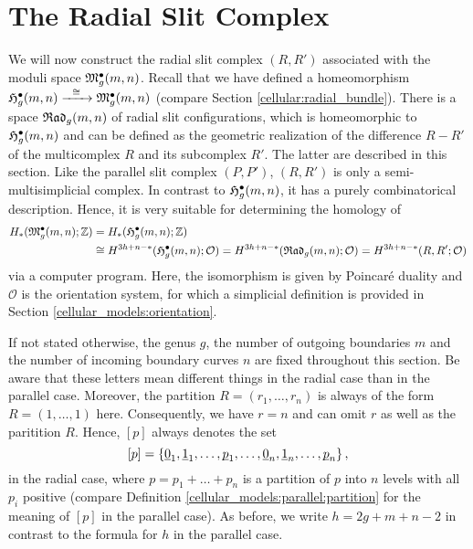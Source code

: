 \section{The Radial Slit Complex}
\label{cellular_models:radial}

We will now construct the radial slit complex $(R,R')$ associated with the moduli space $\mathfrak{M}^\bullet_g(m, n)$.
Recall that we have defined a homeomorphism $\mathfrak{H}^{\bullet}_g(m, n) \xrightarrow{\hspace{6pt}{\cong}\hspace{6pt}} \mathfrak{M}^\bullet_g(m, n)$ (compare Section \ref{cellular:radial_bundle}).
There is a space ${\mathfrak{Rad}_g(m,n)}$ of radial slit configurations, which is homeomorphic to $\mathfrak{H}^{\bullet}_g(m, n)$
and can be defined as the geometric realization of the difference $R - R'$ of the multicomplex $R$ and its subcomplex $R'$.
The latter are described in this section.
Like the parallel slit complex $(P, P')$, $(R, R')$ is only a semi-multisimplicial complex.
In contrast to $\mathfrak{H}^{\bullet}_g(m, n)$, it has a purely combinatorical description.
Hence, it is very suitable for determining the homology of
\begin{align*}
   H_\ast( \mathfrak{M}^\bullet_g(m, n); \mathbb Z ) &= H_\ast( \mathfrak{H}^{\bullet}_g(m, n); \mathbb Z ) \\
                            &\cong H^{3h+n-\ast}( \mathfrak{H}^{\bullet}_g(m, n); \mathcal O ) = H^{3h+n-\ast}( {\mathfrak{Rad}_g(m,n)}; \mathcal O ) = H^{3h+n-\ast}( R, R'; \mathcal O)
\end{align*}
via a computer program.
Here, the isomorphism is given by Poincaré duality and $\mathcal O$ is the orientation system, 
for which a simplicial definition is provided in Section \ref{cellular_models:orientation}.

If not stated otherwise, the genus $g$, the number of outgoing boundaries $m$ and the number of incoming boundary curves $n$ are fixed throughout this section.
Be aware that these letters mean different things in the radial case than in the parallel case.
Moreover, the partition $R = (r_1, \dotsc, r_n)$ is always of the form $R = (1, \dotsc, 1)$ here.
Consequently, we have $r = n$ and can omit $r$ as well as the paritition $R$.
Hence, $[p]$ always denotes the set
\[
    [p] = \{ \ul 0_1, \ul 1_1, \ldots, \ul p_1, \ldots, \ul 0_n, \ul 1_n, \ldots, \ul p_n \}\,,
\]
in the radial case, where $p = p_1+\ldots+p_n$ is a partition of $p$ into $n$ levels with all $p_i$ positive (compare Definition \ref{cellular_models:parallel:partition} for the meaning of $[p]$ in the parallel case). 
As before, we write $h = 2g+m+n-2$ in contrast to the formula for $h$ in the parallel case.

